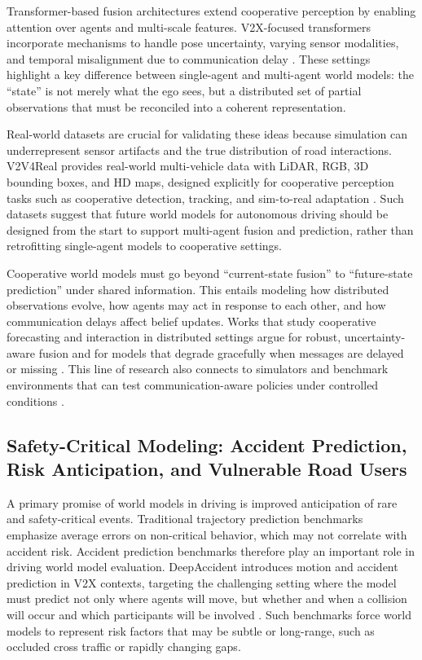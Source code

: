 Transformer-based fusion architectures extend cooperative perception by enabling attention over agents and multi-scale features. V2X-focused transformers incorporate mechanisms to handle pose uncertainty, varying sensor modalities, and temporal misalignment due to communication delay \cite{Xu2022}. These settings highlight a key difference between single-agent and multi-agent world models: the “state” is not merely what the ego sees, but a distributed set of partial observations that must be reconciled into a coherent representation. 

Real-world datasets are crucial for validating these ideas because simulation can underrepresent sensor artifacts and the true distribution of road interactions. V2V4Real provides real-world multi-vehicle data with LiDAR, RGB, 3D bounding boxes, and HD maps, designed explicitly for cooperative perception tasks such as cooperative detection, tracking, and sim-to-real adaptation \cite{Xu2023}. Such datasets suggest that future world models for autonomous driving should be designed from the start to support multi-agent fusion and prediction, rather than retrofitting single-agent models to cooperative settings.

Cooperative world models must go beyond “current-state fusion” to “future-state prediction” under shared information. This entails modeling how distributed observations evolve, how agents may act in response to each other, and how communication delays affect belief updates. Works that study cooperative forecasting and interaction in distributed settings argue for robust, uncertainty-aware fusion and for models that degrade gracefully when messages are delayed or missing \cite{Tu2025,Tu2025b}. This line of research also connects to simulators and benchmark environments that can test communication-aware policies under controlled conditions \cite{Audinys2025,Bouzaiene2025}.

\subsection{Safety-Critical Modeling: Accident Prediction, Risk Anticipation, and Vulnerable Road Users}

A primary promise of world models in driving is improved anticipation of rare and safety-critical events. Traditional trajectory prediction benchmarks emphasize average errors on non-critical behavior, which may not correlate with accident risk. Accident prediction benchmarks therefore play an important role in driving world model evaluation. DeepAccident introduces motion and accident prediction in V2X contexts, targeting the challenging setting where the model must predict not only where agents will move, but whether and when a collision will occur and which participants will be involved \cite{WangDeepAccident2023}. Such benchmarks force world models to represent risk factors that may be subtle or long-range, such as occluded cross traffic or rapidly changing gaps.

